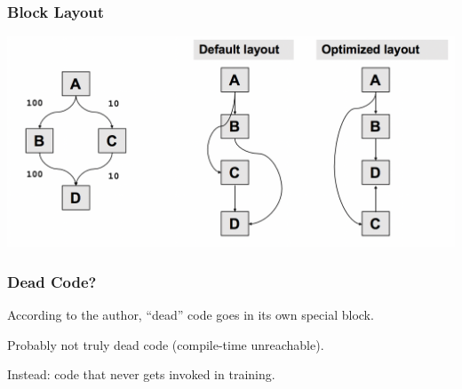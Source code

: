 \begin{frame}
\frametitle{Block Layout}

\begin{center}
	\includegraphics[width=\textwidth]{images/blocklayout.png}
\end{center}

\end{frame}



\begin{frame}
\frametitle{Dead Code?}


\begin{changemargin}{1cm}
According to the author, ``dead'' code goes in its own special block. 

Probably not truly dead code (compile-time unreachable).

Instead: code that never gets invoked in training.
\end{changemargin}

\end{frame}



